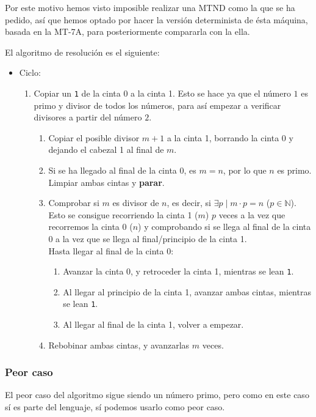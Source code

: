 Por este motivo hemos visto imposible realizar una MTND como la que se ha pedido, así que hemos optado por hacer la versión determinista de ésta máquina, basada en la MT-7A, para posteriormente compararla con la ella.\bigskip

El algoritmo de resolución es el siguiente:
\begin{itemize}
    \item Ciclo:
    \begin{enumerate}
        \item Copiar un \texttt{1} de la cinta 0 a la cinta 1. Esto se hace ya que el número $1$ es primo y divisor de todos los números, para así empezar a verificar divisores a partir del número $2$.
        \begin{enumerate}
            \item Copiar el posible divisor $m+1$ a la cinta 1, borrando la cinta 0 y dejando el cabezal 1 al final de $m$.
            \item Si se ha llegado al final de la cinta 0, es $m=n$, por lo que $n$ es primo. Limpiar ambas cintas y \textbf{parar}.
            \item Comprobar si $m$ es divisor de $n$, es decir, si $\exists p \mid m\cdot p = n$ ($p \in \mathbb{N}$). Esto se consigue recorriendo la cinta 1 ($m$) $p$ veces a la vez que recorremos la cinta 0 ($n$) y comprobando si se llega al final de la cinta 0 a la vez que se llega al final/principio de la cinta 1.\\
            Hasta llegar al final de la cinta 0:
            \begin{enumerate}[1.]
                \item Avanzar la cinta 0, y retroceder la cinta 1, mientras se lean \texttt{1}.
                \item Al llegar al principio de la cinta 1, avanzar ambas cintas, mientras se lean \texttt{1}.
                \item Al llegar al final de la cinta 1, volver a empezar.
            \end{enumerate}
            \item Rebobinar ambas cintas, y avanzarlas $m$ veces.
        \end{enumerate}
    \end{enumerate}
\end{itemize}



\subsubsection*{Peor caso}
El peor caso del algoritmo sigue siendo un número primo, pero como en este caso sí es parte del lenguaje, sí podemos usarlo como peor caso.


